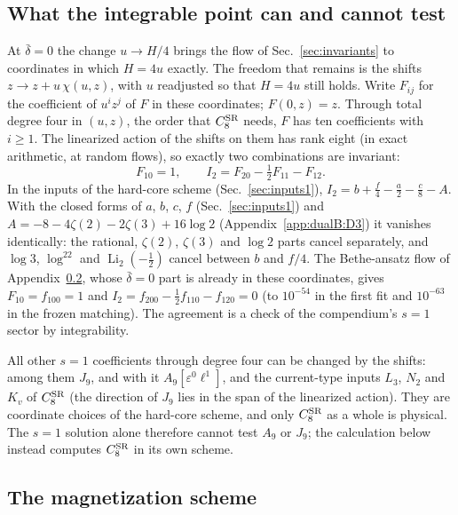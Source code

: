 \documentclass[11pt,a4paper]{article}
\numberwithin{equation}{section}
\newcommand{\CSR}{C^{\rm SR}}
\newcommand{\db}{\bar\delta}
\newcommand{\Li}{\operatorname{Li}}
\begin{document}
\subsection{What the integrable point can and cannot test}\label{app:integ:gauge}
At $\db=0$ the change $u\to H/4$ brings the flow of Sec.~\ref{sec:invariants} to coordinates in which $H=4u$
exactly. The freedom that remains is the shifts $z\to z+u\,\chi(u,z)$, with $u$ readjusted so that $H=4u$ still
holds. Write $F_{ij}$ for the coefficient of $u^iz^j$ of $F$ in these coordinates; $F(0,z)=z$. Through total degree
four in $(u,z)$, the order that $\CSR_8$ needs, $F$ has ten coefficients with $i\ge1$. The linearized action of the
shifts on them has rank eight (in exact arithmetic, at random flows), so exactly two combinations are invariant:
\begin{equation}
 F_{10}=1,\qquad I_2=F_{20}-\tfrac12F_{11}-F_{12}.
\end{equation}
In the inputs of the hard-core scheme (Sec.~\ref{sec:inputs1}), $I_2=b+\frac f4-\frac a2-\frac c8-A$. With the closed
forms of $a$, $b$, $c$, $f$ (Sec.~\ref{sec:inputs1}) and $A=-8-4\zeta(2)-2\zeta(3)+16\log2$
(Appendix~\ref{app:dualB:D3}) it vanishes identically: the rational, $\zeta(2)$, $\zeta(3)$ and $\log2$ parts cancel
separately, and $\log3$, $\log^22$ and $\Li_2(-\frac12)$ cancel between $b$ and $f/4$. The Bethe-ansatz flow of
Appendix~\ref{app:integ:scheme}, whose $\db=0$ part is already in these coordinates, gives $F_{10}=f_{100}=1$ and
$I_2=f_{200}-\frac12f_{110}-f_{120}=0$ (to $10^{-54}$ in the first fit and $10^{-63}$ in the frozen matching). The agreement is a check of the compendium's $s=1$ sector by
integrability.

All other $s=1$ coefficients through degree four can be changed by the shifts: among them $J_9$, and with it
$A_9[\varepsilon^0\ell^1]$, and the current-type inputs $L_3$, $N_2$ and $K_v$ of $\CSR_8$ (the direction of $J_9$ lies
in the span of the linearized action). They are coordinate choices of the hard-core scheme, and only $\CSR_8$ as a
whole is physical. The $s=1$ solution alone therefore cannot test $A_9$ or $J_9$; the calculation below instead
computes $\CSR_8$ in its own scheme.

\subsection{The magnetization scheme}\label{app:integ:scheme}
\end{document}

